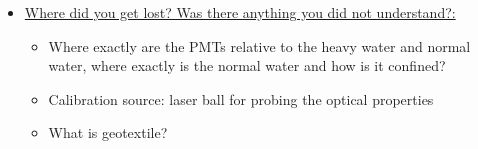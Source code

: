 \documentclass[12pt]{article}
\begin{document}
\begin{itemize}
		\item \ul{Where did you get lost? Was there anything you did not understand?:} \\
		\noindent
		\begin{itemize}
			\item Where exactly are the PMTs relative to the heavy water and normal water, where exactly is the normal water and how is it confined?
			\item Calibration source: laser ball for probing the optical properties
			\item What is geotextile?
		\end{itemize}
		
	\end{itemize}
	
	
\end{document}
